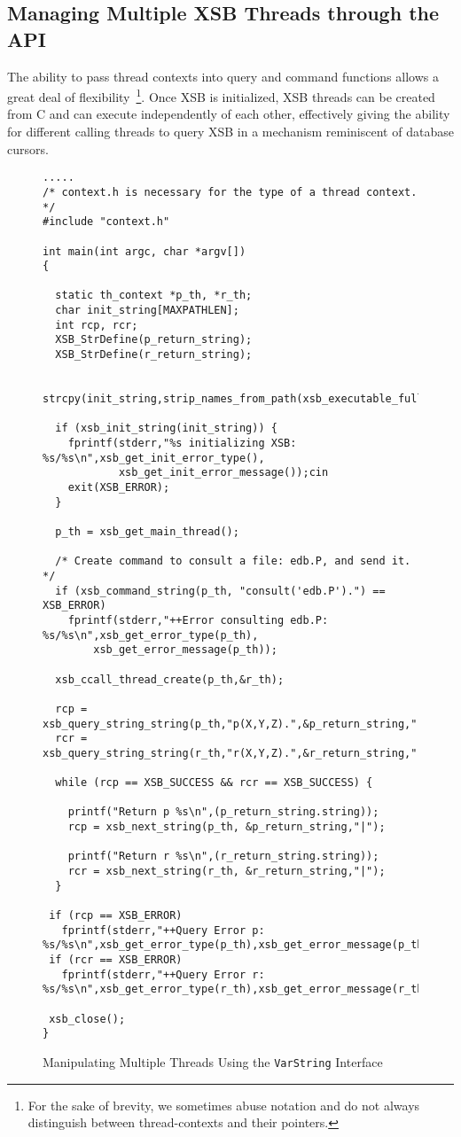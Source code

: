 \subsection{Managing Multiple XSB Threads through the API} \label{sec:CXSBMT}

The ability to pass thread contexts into query and command functions
allows a great deal of flexibility~\footnote{For the sake of brevity,
  we sometimes abuse notation and do not always distinguish between
  thread-contexts and their pointers.}.  Once XSB is initialized, XSB
threads can be created from C and can execute independently of each
other, effectively giving the ability for different calling threads to
query XSB in a mechanism reminiscent of database cursors.

\begin{figure}[hbtp]
\begin{small}
\begin{verbatim}
.....
/* context.h is necessary for the type of a thread context. */
#include "context.h"

int main(int argc, char *argv[])
{ 

  static th_context *p_th, *r_th;
  char init_string[MAXPATHLEN];
  int rcp, rcr;
  XSB_StrDefine(p_return_string);
  XSB_StrDefine(r_return_string);

  strcpy(init_string,strip_names_from_path(xsb_executable_full_path(argv[0]),3));

  if (xsb_init_string(init_string)) {
    fprintf(stderr,"%s initializing XSB: %s/%s\n",xsb_get_init_error_type(),
            xsb_get_init_error_message());cin
    exit(XSB_ERROR);
  }

  p_th = xsb_get_main_thread();

  /* Create command to consult a file: edb.P, and send it. */
  if (xsb_command_string(p_th, "consult('edb.P').") == XSB_ERROR)
    fprintf(stderr,"++Error consulting edb.P: %s/%s\n",xsb_get_error_type(p_th),
	    xsb_get_error_message(p_th));

  xsb_ccall_thread_create(p_th,&r_th);

  rcp = xsb_query_string_string(p_th,"p(X,Y,Z).",&p_return_string,"|");
  rcr = xsb_query_string_string(r_th,"r(X,Y,Z).",&r_return_string,"|");

  while (rcp == XSB_SUCCESS && rcr == XSB_SUCCESS) {

    printf("Return p %s\n",(p_return_string.string));
    rcp = xsb_next_string(p_th, &p_return_string,"|");

    printf("Return r %s\n",(r_return_string.string));
    rcr = xsb_next_string(r_th, &r_return_string,"|");
  }

 if (rcp == XSB_ERROR) 
   fprintf(stderr,"++Query Error p: %s/%s\n",xsb_get_error_type(p_th),xsb_get_error_message(p_th));
 if (rcr == XSB_ERROR) 
   fprintf(stderr,"++Query Error r: %s/%s\n",xsb_get_error_type(r_th),xsb_get_error_message(r_th));

 xsb_close();      
}
\end{verbatim}
\end{small}
\caption{Manipulating Multiple Threads Using the {\tt VarString} Interface} 
\label{fig:varstringex2}
\end{figure}

